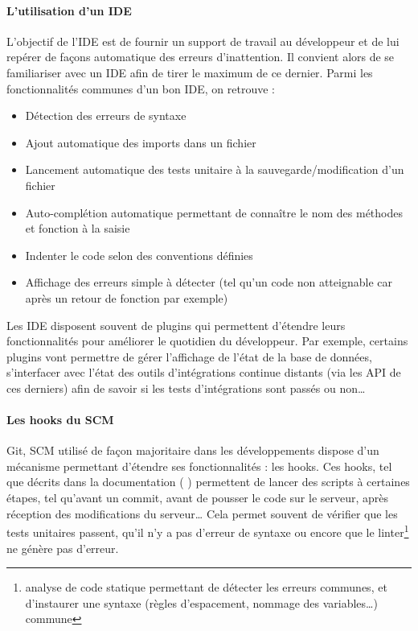 \paragraph{L'utilisation d'un IDE}

L'objectif de l'\gls{IDE} est de fournir un support de travail au développeur et de lui repérer de façons automatique des erreurs d'inattention. Il convient alors de se familiariser avec un \gls{IDE} afin de tirer le maximum de ce dernier. Parmi les fonctionnalités communes d'un bon \gls{IDE}, on retrouve :

\begin{itemize}
	\setlength\itemsep{-0.5em}
	\item Détection des erreurs de syntaxe
	\item Ajout automatique des imports dans un fichier
	\item Lancement automatique des tests unitaire à la sauvegarde/modification d'un fichier
	\item Auto-complétion automatique permettant de connaître le nom des méthodes et fonction à la saisie
	\item Indenter le code selon des conventions définies
	\item Affichage des erreurs simple à détecter (tel qu'un code non atteignable car après un retour de fonction par exemple)
\end{itemize}

Les \gls{IDE} disposent souvent de plugins qui permettent d'étendre leurs fonctionnalités pour améliorer le quotidien du développeur. Par exemple, certains plugins vont permettre de gérer l'affichage de l'état de la base de données, s'interfacer avec l'état des outils d'intégrations continue distants (via les \gls{API} de ces derniers) afin de savoir si les tests d'intégrations sont passés ou non\ldots

\paragraph{Les hooks du SCM} Git, \gls{SCM} utilisé de façon majoritaire dans les développements dispose d'un mécanisme permettant d'étendre ses fonctionnalités : les hooks. Ces hooks, tel que décrits dans la documentation ( \cite[chapitre 8.3]{git-hook}) permettent de lancer des scripts à certaines étapes, tel qu'avant un commit, avant de pousser le code sur le serveur, après réception des modifications du serveur\ldots{} Cela permet souvent de vérifier que les tests unitaires passent, qu'il n'y a pas d'erreur de syntaxe ou encore que le linter\footnote{analyse de code statique permettant de détecter les erreurs communes, et d'instaurer une syntaxe (règles d'espacement, nommage des variables\ldots) commune} ne génère pas d'erreur.

